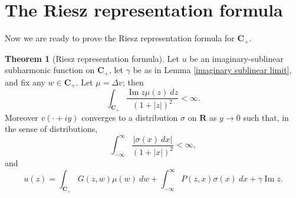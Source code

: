 \documentclass[12pt]{report}
\newcommand{\RR}{\mathbf{R}}
\newcommand{\CC}{\mathbf{C}}
\renewcommand{\Im}{\operatorname{Im}}
\theoremstyle{definition}
\newtheorem{theorem}{Theorem}[chapter]
\begin{document}
\section{The Riesz representation formula}
Now we are ready to prove the Riesz representation formula for $\CC_+$.
\begin{theorem}[Riesz representation formula]
    Let $u$ be an imaginary-sublinear subharmonic function on $\CC_+$, let $\gamma$ be as in Lemma \ref{imaginary sublinear limit}, and fix any $w \in \CC_+$. Let $\mu = \Delta v$; then
    \begin{equation}\label{estimate on mu}\int_{\CC_+} \frac{\Im z \mu(z) ~dz}{(1 + |z|)^2} < \infty.\end{equation}
    Moreover $v(\cdot + iy)$ converges to a distribution $\sigma$ on $\RR$ as $y \to 0$ such that, in the sense of distributions,
\begin{equation}\label{estimate on sigma}\int_{-\infty}^\infty \frac{|\sigma(x) ~dx|}{(1 + |x|)^2} < \infty,\end{equation}
    and
\begin{equation}\label{riesz formula}u(z) = \int_{\CC_+} G(z, w) \mu(w) ~dw + \int_{-\infty}^\infty P(z, x) \sigma(x) ~dx + \gamma \Im z.\end{equation}
\end{theorem}
\end{document}
